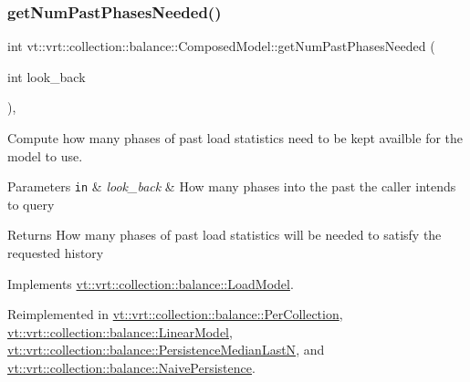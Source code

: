 \mbox{\label{classvt_1_1vrt_1_1collection_1_1balance_1_1_composed_model_a1fb8c98e3500be582095a54369661316}} 
\subsubsection{\texorpdfstring{get\+Num\+Past\+Phases\+Needed()}{getNumPastPhasesNeeded()}}
{\footnotesize\ttfamily int vt\+::vrt\+::collection\+::balance\+::\+Composed\+Model\+::get\+Num\+Past\+Phases\+Needed (\begin{DoxyParamCaption}\item[{int}]{look\+\_\+back }\end{DoxyParamCaption})\hspace{0.3cm}{\ttfamily [override]}, {\ttfamily [virtual]}}



Compute how many phases of past load statistics need to be kept availble for the model to use. 


\begin{DoxyParams}[1]{Parameters}
\mbox{\tt in}  & {\em look\+\_\+back} & How many phases into the past the caller intends to query\\
\hline
\end{DoxyParams}
\begin{DoxyReturn}{Returns}
How many phases of past load statistics will be needed to satisfy the requested history 
\end{DoxyReturn}


Implements \hyperlink{classvt_1_1vrt_1_1collection_1_1balance_1_1_load_model_a8955e87a6225fbce0060318d9d1858dd}{vt\+::vrt\+::collection\+::balance\+::\+Load\+Model}.



Reimplemented in \hyperlink{structvt_1_1vrt_1_1collection_1_1balance_1_1_per_collection_aad4e752227fdf875194673cfb98e04e6}{vt\+::vrt\+::collection\+::balance\+::\+Per\+Collection}, \hyperlink{structvt_1_1vrt_1_1collection_1_1balance_1_1_linear_model_af21543dccfa23d2843a3b95b1ec15653}{vt\+::vrt\+::collection\+::balance\+::\+Linear\+Model}, \hyperlink{structvt_1_1vrt_1_1collection_1_1balance_1_1_persistence_median_last_n_a236ce9aa3fc3a38111160fc8c4a0e336}{vt\+::vrt\+::collection\+::balance\+::\+Persistence\+Median\+LastN}, and \hyperlink{structvt_1_1vrt_1_1collection_1_1balance_1_1_naive_persistence_abf20213225a6a25ed7cf119c7a86d834}{vt\+::vrt\+::collection\+::balance\+::\+Naive\+Persistence}.


